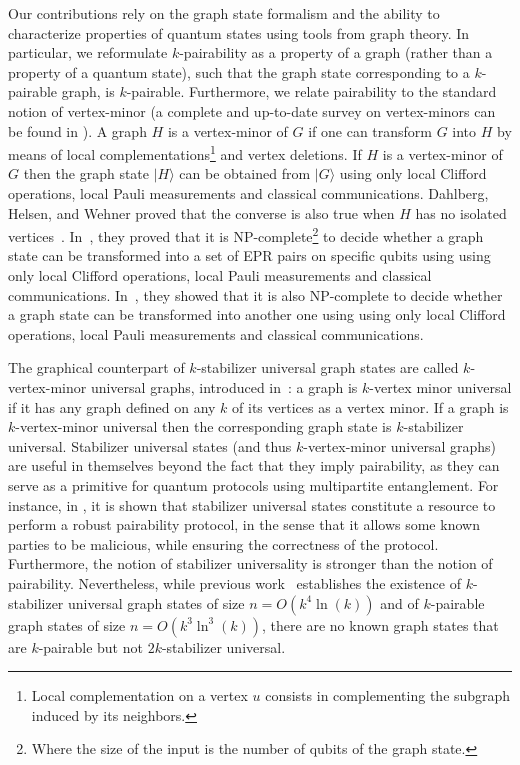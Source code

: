 \documentclass[a4paper,UKenglish,cleveref, autoref, thm-restate]{arxiv}
\newcommand{\ket}[1]{{\ensuremath{\lvert#1\rangle}}}
\begin{document}
Our contributions rely on the graph state formalism and the ability to characterize properties of quantum states using tools from graph theory. In particular, we reformulate $k$-pairability as a property of a graph (rather than a property of a quantum state), such that the graph state corresponding to a $k$-pairable graph, is $k$-pairable. Furthermore, we relate pairability to the standard notion of vertex-minor (a complete and up-to-date survey on vertex-minors can be found in \cite{kim2023vertex}). A graph $H$ is a vertex-minor of $G$ if one can transform $G$ into $H$ by means of local complementations\footnote{Local complementation on a vertex $u$ consists  in complementing the subgraph induced by its neighbors.} and vertex deletions. If $H$ is a vertex-minor of $G$ then the graph state $\ket{H}$ can be obtained from $\ket G$ using only local Clifford operations, local Pauli measurements and classical communications. Dahlberg, Helsen, and Wehner proved that the converse is also true when $H$ has no isolated vertices~\cite{DWH:transfo}. In~\cite{dahlberg2020transforming}, they proved that it is NP-complete\footnote{Where the size of the input is the number of qubits of the graph state.} to decide whether a graph state can be transformed into a set of EPR pairs on specific qubits using using only local Clifford operations, local Pauli measurements and classical communications. In~\cite{DHW:howtotransform}, they showed that it is also NP-complete to decide whether a graph state can be transformed into another one using using only local Clifford operations, local Pauli measurements and classical communications.

The graphical counterpart of $k$-stabilizer universal graph states are called $k$-vertex-minor universal graphs, introduced in~\cite{claudet2023small}: a graph is $k$-vertex minor universal if it has any graph defined on any $k$ of its vertices as a vertex minor. If a graph is $k$-vertex-minor universal then the corresponding graph state is $k$-stabilizer universal. 
Stabilizer universal states (and thus $k$-vertex-minor universal graphs) are useful in themselves beyond the fact that they imply pairability, as they can serve as a primitive for quantum protocols using multipartite entanglement.  For instance, in \cite{claudet2023small}, it is shown that stabilizer universal states constitute a resource to perform a robust pairability protocol, in the sense that it allows some known parties to be malicious, while ensuring the correctness of the protocol. Furthermore, the notion of stabilizer universality is stronger than the notion of pairability. Nevertheless, while previous work~\cite{claudet2023small} establishes the existence of $k$-stabilizer universal graph states of size $n = O(k^4 \ln(k))$ and  of $k$-pairable graph states of size $n = O(k^3 \ln^3(k))$, there are no known graph states that are $k$-pairable but not $2k$-stabilizer universal.
\end{document}
